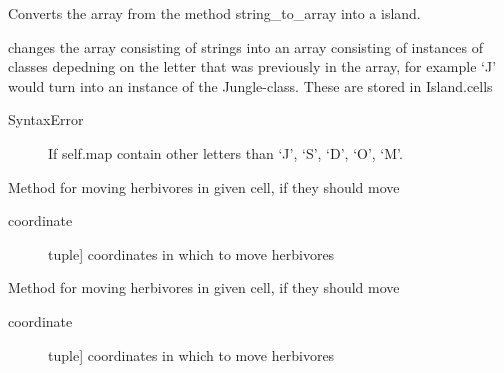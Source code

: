 \documentclass[a4paper,10pt,english]{sphinxmanual}
\begin{document}
\begin{fulllineitems}
\begin{fulllineitems}
\label{\detokenize{island:biosim.island.Island.array_to_island}}
Converts the array from the method string\_to\_array into a island.

changes the array consisting of strings into an array consisting of
instances of classes depedning on the letter that was previously in
the array, for example `J' would turn into an instance of the
Jungle-class. These are stored in Island.cells
\begin{description}
\item[{SyntaxError}] \leavevmode
If self.map contain other letters than `J', `S', `D', `O', `M'.

\end{description}

\end{fulllineitems}


\begin{fulllineitems}
\label{\detokenize{island:biosim.island.Island.cell_move_carnivores}}
Method for moving herbivores in given cell, if they should move
\begin{description}
\item[{coordinate}] \leavevmode{[}tuple{]}
coordinates in which to move herbivores

\end{description}

\end{fulllineitems}


\begin{fulllineitems}
\label{\detokenize{island:biosim.island.Island.cell_move_herbivores}}
Method for moving herbivores in given cell, if they should move
\begin{description}
\item[{coordinate}] \leavevmode{[}tuple{]}
coordinates in which to move herbivores

\end{description}

\end{fulllineitems}


\end{fulllineitems}
\end{document}
